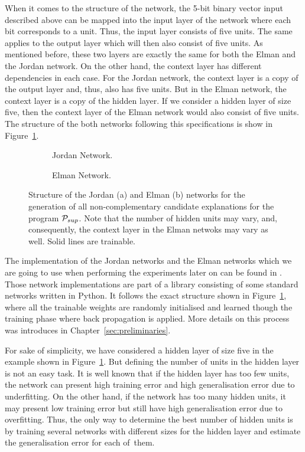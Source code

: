 When it comes to the structure of the network, the 5-bit binary vector input described above can be mapped into the input layer of the network where each bit corresponds to a unit. Thus, the input layer consists of five units. The same applies to the output layer which will then also consist of five units. As mentioned before, these two layers are exactly the same for both the Elman and the Jordan network. On the other hand, the context layer has different dependencies in each case. For the Jordan network, the context layer is a copy of the output layer and, thus, also has five units. But in the Elman network, the context layer is a copy of the hidden layer. If we consider a hidden layer of size five, then the context layer of the Elman network would also consist of five units. The structure of the both networks following this specifications is show in Figure~\ref{fig:rnn}.

\begin{figure}
\centering
   \begin{subfigure}[b]{0.55\textwidth}
   \scalebox{0.8}{\jordannc}
   \caption{Jordan Network.}
   \bigskip
\end{subfigure}
\begin{subfigure}[b]{0.55\textwidth}
   \scalebox{0.8}{\elmannc}
   \caption{Elman Network.}
\end{subfigure}
\caption{Structure of the Jordan (a) and Elman (b) networks for the generation of all non-complementary candidate explanations for the program $\mathcal{P}_{sup}$. Note that the number of hidden units may vary, and, consequently, the context layer in the Elman netwoks may vary as well. Solid lines are trainable.}
\label{fig:rnn}
\end{figure}

The implementation of the Jordan networks and the Elman networks which we are going to use when performing the experiments later on can be found in \cite{rougier2012}. Those network implementations are part of a library consisting of some standard networks written in Python. It follows the exact structure shown in Figure~\ref{fig:rnn}, where all the trainable weights are randomly initialised and learned though the training phase where back propagation is applied. More details on this process was introduces in Chapter~\ref{sec:preliminaries}.

For sake of simplicity, we have considered a hidden layer of size five in the example shown in Figure~\ref{fig:rnn}. But defining the number of units in the hidden layer is not an easy task. It is well known that if the hidden layer has too few units, the network can present high training error and high generalisation error due to underfitting. On the other hand, if the network has too many hidden units, it may present low training error but still have high generalisation error due to overfitting. Thus, the only way to determine the best number of hidden units is by training several networks with different sizes for the hidden layer and estimate the generalisation error for each of~them.

